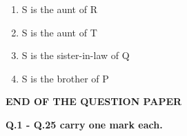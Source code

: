 \documentclass[12pt]{article}
\begin{document}
\begin{enumerate}[start=6,label=Q.\arabic*]
		\begin{enumerate}[label=(\Alph*)]
			\item S is the aunt of R 
			\item S is the aunt of T 
			\item S is the sister-in-law of Q 
			\item S is the brother of P
		\end{enumerate}































		\begin{center}
			{\textbf{END OF THE QUESTION PAPER}}
		\end{center}
		\newpage
\end{enumerate}
\setcounter{page}{1}
\noindent\textbf{Q.1 - Q.25 carry one mark each.}
\end{document}
